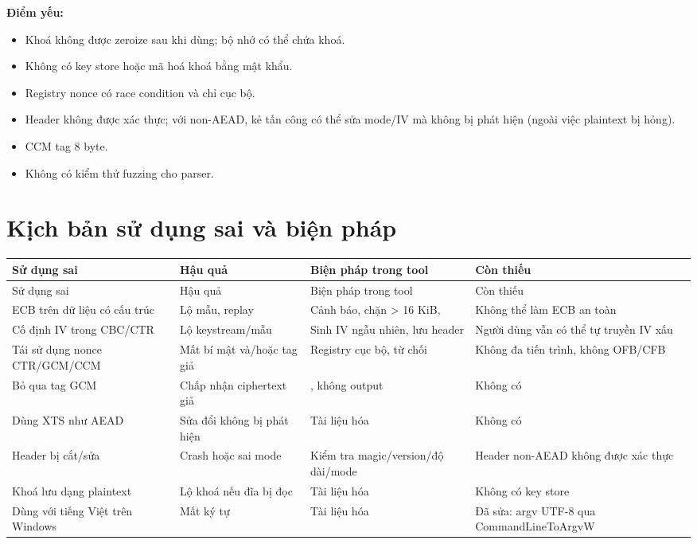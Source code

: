 \documentclass[12pt,a4paper,oneside]{report}
\let\origtexttt\texttt
\renewcommand{\texttt}[1]{\origtexttt{\seqsplit{#1}}}
\begin{document}
\textbf{Điểm yếu:}


\begin{itemize}[leftmargin=*]
\item Khoá không được zeroize sau khi dùng; bộ nhớ có thể chứa khoá.
\item Không có key store hoặc mã hoá khoá bằng mật khẩu.
\item Registry nonce có race condition và chỉ cục bộ.
\item Header không được xác thực; với non-AEAD, kẻ tấn công có thể sửa mode/IV mà không bị phát hiện (ngoài việc plaintext bị hỏng).
\item CCM tag 8 byte.
\item Không có kiểm thử fuzzing cho parser.
\end{itemize}


\section{Kịch bản sử dụng sai và biện pháp}


\begin{longtable}{p{}p{}p{}p{}}
\toprule
Sử dụng sai & Hậu quả & Biện pháp trong tool & Còn thiếu \\
\midrule
\endfirsthead
\toprule
Sử dụng sai & Hậu quả & Biện pháp trong tool & Còn thiếu \\
\midrule
\endhead
ECB trên dữ liệu có cấu trúc & Lộ mẫu, replay & Cảnh báo, chặn > 16 KiB, \texttt{--allow-ecb} & Không thể làm ECB an toàn \\
Cố định IV trong CBC/CTR & Lộ keystream/mẫu & Sinh IV ngẫu nhiên, lưu header & Người dùng vẫn có thể tự truyền IV xấu \\
Tái sử dụng nonce CTR/GCM/CCM & Mất bí mật và/hoặc tag giả & Registry cục bộ, từ chối & Không đa tiến trình, không OFB/CFB \\
Bỏ qua tag GCM & Chấp nhận ciphertext giả & \texttt{THROW\_EXCEPTION}, không output & Không có \\
Dùng XTS như AEAD & Sửa đổi không bị phát hiện & Tài liệu hóa & Không có \\
Header bị cắt/sửa & Crash hoặc sai mode & Kiểm tra magic/version/độ dài/mode & Header non-AEAD không được xác thực \\
Khoá lưu dạng plaintext & Lộ khoá nếu đĩa bị đọc & Tài liệu hóa & Không có key store \\
Dùng \texttt{--text} với tiếng Việt trên Windows & Mất ký tự & Tài liệu hóa & Đã sửa: argv UTF-8 qua CommandLineToArgvW \\
\bottomrule
\end{longtable}
\end{document}
